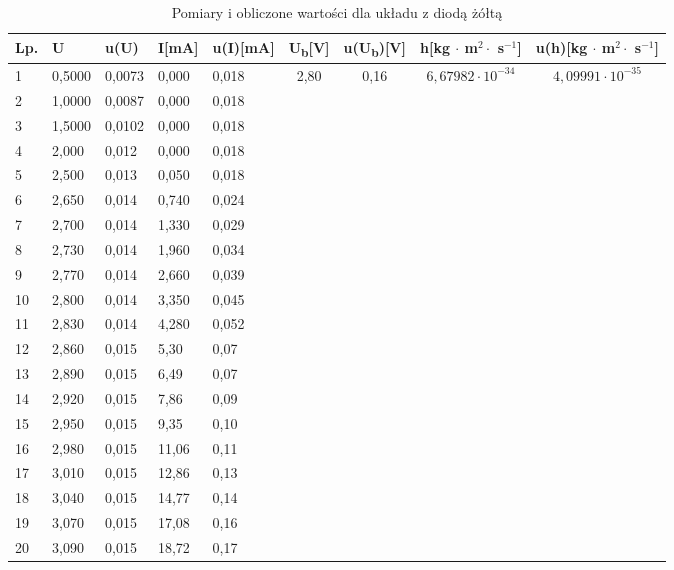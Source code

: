 \documentclass[12pt]{article}
\begin{document}
\begin{table}[]
    \caption*{Pomiary i obliczone wartości dla układu z diodą żółtą}
    \begin{tabular}{|l|l|l|l|l|c|c|c|c|} \hline
        Lp. & U & u(U) & I[mA] & u(I)[mA] & U\textsubscript{b}[V] & u(U\textsubscript{b})[V] & h[kg $\cdot$ m$^2 \cdot$ s$^{-1}$] & u(h)[kg $\cdot$ m$^2 \cdot$ s$^{-1}$] \\ \hline
        1 & 0,5000 & 0,0073 & 0,000 & 0,018 & \multirow{20}{*}{2,80} & \multirow{20}{*}{0,16} & \multirow{20}{*}{$6,67982 \cdot 10^{-34}$} & \multirow{20}{*}{$4,09991 \cdot 10^{-35}$} \\ \cline{1-5}
        2 & 1,0000 & 0,0087 & 0,000 & 0,018 &  &  &  &  \\ \cline{1-5}
        3 & 1,5000 & 0,0102 & 0,000 & 0,018 &  &  &  &  \\ \cline{1-5}
        4 & 2,000 & 0,012 & 0,000 & 0,018 &  &  &  &  \\ \cline{1-5}
        5 & 2,500 & 0,013 & 0,050 & 0,018 &  &  &  &  \\ \cline{1-5}
        6 & 2,650 & 0,014 & 0,740 & 0,024 &  &  &  &  \\ \cline{1-5}
        7 & 2,700 & 0,014 & 1,330 & 0,029 &  &  &  &  \\ \cline{1-5}
        8 & 2,730 & 0,014 & 1,960 & 0,034 &  &  &  &  \\ \cline{1-5}
        9 & 2,770 & 0,014 & 2,660 & 0,039 &  &  &  &  \\ \cline{1-5}
        10 & 2,800 & 0,014 & 3,350 & 0,045 &  &  &  &  \\ \cline{1-5}
        11 & 2,830 & 0,014 & 4,280 & 0,052 &  &  &  &  \\ \cline{1-5}
        12 & 2,860 & 0,015 & 5,30 & 0,07 &  &  &  &  \\ \cline{1-5}
        13 & 2,890 & 0,015 & 6,49 & 0,07 &  &  &  &  \\ \cline{1-5}
        14 & 2,920 & 0,015 & 7,86 & 0,09 &  &  &  &  \\ \cline{1-5}
        15 & 2,950 & 0,015 & 9,35 & 0,10 &  &  &  &  \\ \cline{1-5}
        16 & 2,980 & 0,015 & 11,06 & 0,11 &  &  &  &  \\ \cline{1-5}
        17 & 3,010 & 0,015 & 12,86 & 0,13 &  &  &  &  \\ \cline{1-5}
        18 & 3,040 & 0,015 & 14,77 & 0,14 &  &  &  &  \\ \cline{1-5}
        19 & 3,070 & 0,015 & 17,08 & 0,16 &  &  &  &  \\ \cline{1-5}
        20 & 3,090 & 0,015 & 18,72 & 0,17 &  &  &  &  \\ \hline
    \end{tabular}
\end{table}
\end{document}
